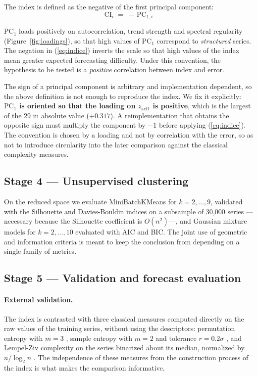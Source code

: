 The index is defined as the negative of the first principal component:
\begin{equation}
\mathrm{CI}_i \;=\; -\,\mathrm{PC}_{1,i}
\label{eq:indice}
\end{equation}

$\mathrm{PC}_1$ loads positively on autocorrelation, trend strength and spectral
regularity (Figure~\ref{fig:loadings}), so that high values of $\mathrm{PC}_1$ correspond
to \emph{structured} series. The negation in (\ref{eq:indice}) inverts the scale so that
high values of the index mean greater expected forecasting difficulty. Under this
convention, the hypothesis to be tested is a \emph{positive} correlation between index and
error.

The sign of a principal component is arbitrary and implementation dependent, so the above
definition is not enough to reproduce the index. We fix it explicitly: \textbf{$\mathrm{PC}_1$
is oriented so that the loading on $z_{\mathrm{acf1}}$ is positive}, which is the largest
of the 29 in absolute value ($+0.317$). A reimplementation that obtains the opposite sign
must multiply the component by $-1$ before applying (\ref{eq:indice}). The convention is
chosen by a loading and not by correlation with the error, so as not to introduce
circularity into the later comparison against the classical complexity measures.

\subsection{Stage 4 --- Unsupervised clustering}

On the reduced space we evaluate MiniBatchKMeans for $k=2,\dots,9$, validated with the
Silhouette and Davies-Bouldin indices on a subsample of 30{,}000 series ---necessary
because the Silhouette coefficient is $O(n^{2})$---, and Gaussian mixture models for
$k=2,\dots,10$ evaluated with AIC and BIC. The joint use of geometric and
information criteria is meant to keep the conclusion from depending on a single family of
metrics.

\subsection{Stage 5 --- Validation and forecast evaluation}

\paragraph{External validation.} The index is contrasted with three classical measures
computed directly on the raw values of the training series, without using the descriptors:
permutation entropy with $m=3$ \cite{bandt2002}, sample entropy with $m=2$ and tolerance
$r=0.2\sigma$ \cite{richman2000}, and Lempel-Ziv complexity on the series binarized about
its median, normalized by $n/\log_2 n$ \cite{lempel1976}. The independence of these
measures from the construction process of the index is what makes the comparison
informative.

